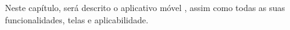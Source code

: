 Neste capítulo, será descrito o aplicativo móvel \appName, assim como todas as suas funcionalidades, telas e aplicabilidade.